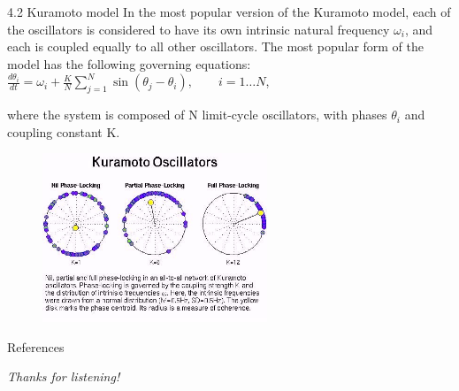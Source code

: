 \documentclass[
  notheorems,
  aspectratio=54,
]{beamer}
\begin{document}
\begin{frame}{4.2 Kuramoto model}
  In the most popular version of the Kuramoto model, each of the oscillators is considered to have its own intrinsic natural frequency
  $\omega _{i}$, and each is coupled equally to all other oscillators.
  The most popular form of the model has the following governing equations:
  \\\centering ${\frac  {d\theta _{i}}{dt}}=\omega _{i}+{\frac  {K}{N}}\sum _{{j=1}}^{{N}}\sin(\theta _{j}-\theta _{i}),\qquad i=1\ldots N$,
  \\\raggedright where the system is composed of N limit-cycle oscillators, with phases ${\displaystyle \theta _{i}}$ and coupling constant K.
  \begin{figure}
    \centering
    \includegraphics[width=0.6\textwidth]{kuramoto_oscilators.jpg}
  \end{figure}
\end{frame}

\begin{frame}{References}
    \printbibliography
\end{frame}

\begin{frame}{}
  \centering \Huge
  \emph{Thanks for listening!}
\end{frame}
\end{document}
